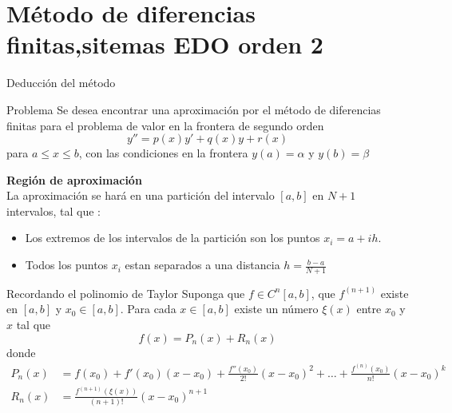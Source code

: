 \section{Método de diferencias finitas,sitemas EDO orden 2}
\begin{frame}{Deducción del método}
\begin{block}{Problema}
Se desea encontrar una aproximación por el método de diferencias finitas para el problema de valor en la frontera de segundo orden
$$y''=p(x)y'+q(x)y+r(x)$$
para $a\leq x\leq b$, con las condiciones en la frontera $y(a)=\alpha$ y $y(b)=\beta$
\end{block}

\textbf{Región de aproximación}\\
La aproximación se hará en una partición del intervalo $[a, b]$ en $N+1$ intervalos, tal que :
\begin{itemize}
\item Los extremos de los intervalos de la partición son los puntos $x_i=a+ih$.
\item  Todos los puntos $x_i$ estan separados a una distancia $h=\frac{b-a}{N+1}$
\end{itemize}
\end{frame}

\begin{frame}{Recordando el polinomio de Taylor}
Suponga que $f \in C^n[a, b]$, que $f^{(n+1)}$ existe en $[a, b]$ y $x_0 \in [a, b]$. Para cada $x \in [a,b]$ existe un número $\xi(x)$ entre $x_0$ y $x$ tal que
$$f(x)=P_n(x)+R_n(x)$$
donde 
\begin{align*}
P_n(x)&=f(x_0)+f'(x_0)(x-x_0)+\frac{f''(x_0)}{2!}(x-x_0)^2+\hdots + \frac{f^{(n)}(x_0)}{n!}(x-x_0)^k\\
R_n(x) &=\frac{f^{(n+1)}(\xi(x))}{(n+1)!}(x-x_0)^{n+1}\\
\end{align*}
\end{frame}

